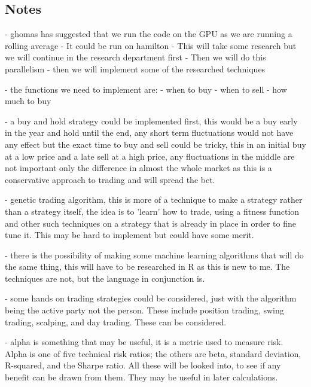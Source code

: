 \documentclass[conference]{IEEEtran}
\begin{document}
\subsection*{Notes}
- ghomas has suggested that we run the code on the GPU as we are running a rolling average
- It could be run on hamilton
- This will take some research but we will continue in the research department first
- Then we will do this parallelism
- then we will implement some of the researched techniques

- the functions we need to implement are:
- when to buy
- when to sell
- how much to buy

- a buy and hold strategy could be implemented first, this would be a buy early in the year and hold until the end, any short term fluctuations would not have any effect but the exact time to buy and sell could be tricky, this in an initial buy at a low price and a late sell at a high price, any fluctuations in the middle are not important only the difference in almost the whole market as this is a conservative approach to trading and will spread the bet.

- genetic trading algorithm, this is more of a technique to make a strategy rather than a strategy itself, the idea is to 'learn' how to trade, using a fitness function and other such techniques on a strategy that is already in place in order to fine tune it. This may be hard to implement but could have some merit.

- there is the possibility of making some machine learning algorithms that will do the same thing, this will have to be researched in R as this is new to me. The techniques are not, but the language in conjunction is.

- some hands on trading strategies could be considered, just with the algorithm being the active party not the person. These include position trading, swing trading, scalping, and day trading. These can be considered.

- alpha is something that may be useful, it is a metric used to measure risk. Alpha is one of five technical risk ratios; the others are beta, standard deviation, R-squared, and the Sharpe ratio. All these will be looked into, to see if any benefit can be drawn from them. They may be useful in later calculations.
\fi
\end{document}
